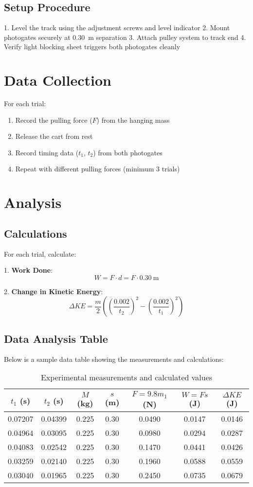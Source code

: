 \documentclass[12pt]{article}
\begin{document}
\subsection{Setup Procedure}
1. Level the track using the adjustment screws and level indicator
2. Mount photogates securely at \SI{0.30}{\meter} separation
3. Attach pulley system to track end
4. Verify light blocking sheet triggers both photogates cleanly

\section{Data Collection}

For each trial:
\begin{enumerate}
\item Record the pulling force ($F$) from the hanging mass
\item Release the cart from rest
\item Record timing data ($t_1$, $t_2$) from both photogates
\item Repeat with different pulling forces (minimum 3 trials)
\end{enumerate}

\section{Analysis}

\subsection{Calculations}
For each trial, calculate:

1. \textbf{Work Done}:
   $$W = F \cdot d = F \cdot \SI{0.30}{\meter}$$

2. \textbf{Change in Kinetic Energy}:
   $$\Delta KE = \frac{m}{2}\left(\left(\frac{0.002}{t_2}\right)^2 - \left(\frac{0.002}{t_1}\right)^2\right)$$

\subsection{Data Analysis Table}
Below is a sample data table showing the measurements and calculations:

\begin{table}[htbp]
\centering
\begin{tabular}{ccccccc}
\toprule
$t_1$ (s) & $t_2$ (s) & $M$ (kg) & $s$ (m) & $F=9.8m_1$ (N) & $W=Fs$ (J) & $\Delta KE$ (J) \\
\midrule
0.07207 & 0.04399 & 0.225 & 0.30 & 0.0490 & 0.0147 & 0.0146 \\
0.04964 & 0.03095 & 0.225 & 0.30 & 0.0980 & 0.0294 & 0.0287 \\
0.04083 & 0.02542 & 0.225 & 0.30 & 0.1470 & 0.0441 & 0.0426 \\
0.03259 & 0.02140 & 0.225 & 0.30 & 0.1960 & 0.0588 & 0.0559 \\
0.03040 & 0.01965 & 0.225 & 0.30 & 0.2450 & 0.0735 & 0.0679 \\
\bottomrule
\end{tabular}
\caption{Experimental measurements and calculated values}
\end{table}
\end{document}

